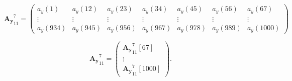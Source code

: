 \begin{equation} \label{eq:etde2_exampleA2}
\boldsymbol{{A_y}}^{7}_{11}  = 
\begin{pmatrix}
  	a_y(1) & a_y(12) & a_y(23) & a_y(34) & a_y(45) & a_y(56) &  a_y(67) \\ 
	\vdots & \vdots & \vdots & \vdots & \vdots & \vdots & \vdots \\
  	a_y(934) & a_y(945) & a_y(956) &  a_y(967) &  a_y(978) &  a_y(989) & a_y(1000) 
\end{pmatrix}
\end{equation}

\begin{equation} \label{eq:etde2_exampleA2}
\boldsymbol{{A_y}}^{7}_{11}  = 
\begin{pmatrix}
\boldsymbol{{A_y}}^{7}_{11}[67] \\
\vdots \\
\boldsymbol{{A_y}}^{7}_{11}[1000] 
\end{pmatrix}.
\end{equation}






